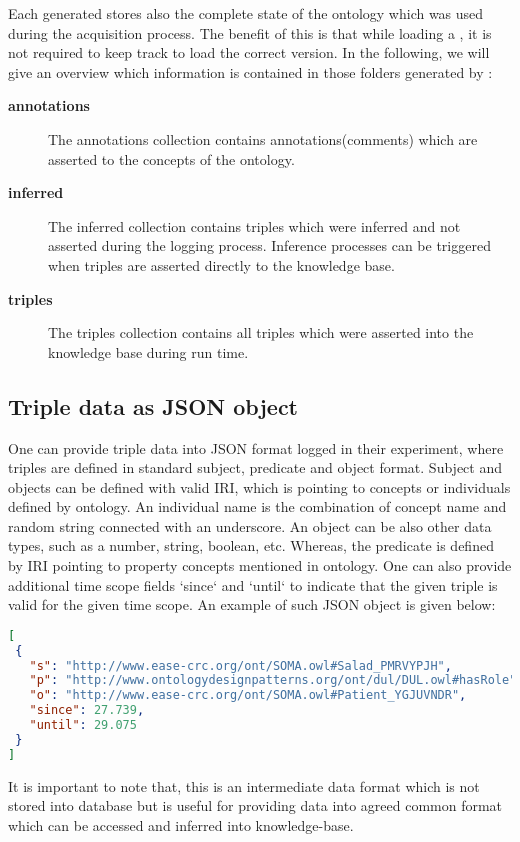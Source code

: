 Each generated \neem stores also the complete state of the \soma ontology which was used during the acquisition process.
The benefit of this is that while loading a \neem, it is not required to keep track to load the correct \soma version.
In the following, we will give an overview which information is contained in those folders generated by \knowrob:


\begin{description}
	\item[\textbf{annotations}] The annotations collection contains annotations(comments) which are asserted to the concepts of the ontology.
	\item[\textbf{inferred}] The inferred collection contains triples which were inferred and not asserted during the logging process. Inference processes can be triggered when triples are asserted directly to the knowledge base.
	\item[\textbf{triples}] The triples collection contains all triples which were asserted into the knowledge base during run time.
\end{description}

\subsection{Triple data as JSON object}
	One can provide triple data into JSON format logged in their experiment, where triples are defined in standard subject, predicate and object format. Subject and objects can be defined with valid IRI, which is pointing to concepts or individuals defined by ontology. An individual name is the combination of concept name and random string connected with an underscore. An object can be also other data types, such as a number, string, boolean, etc. Whereas, the predicate is defined by IRI pointing to property concepts mentioned in  ontology. One can also provide additional time scope fields `since` and `until` to indicate that the given triple is valid for the given time scope. An example of such JSON object is given below:
\begin{lstlisting}[language=json,firstnumber=1]
[
 {
   "s": "http://www.ease-crc.org/ont/SOMA.owl#Salad_PMRVYPJH",
   "p": "http://www.ontologydesignpatterns.org/ont/dul/DUL.owl#hasRole",
   "o": "http://www.ease-crc.org/ont/SOMA.owl#Patient_YGJUVNDR",
   "since": 27.739,
   "until": 29.075
 }
]
\end{lstlisting}

It is important to note that, this is an intermediate data format which is not stored into database but is useful for providing data into agreed common format which can be accessed and inferred into knowledge-base.



